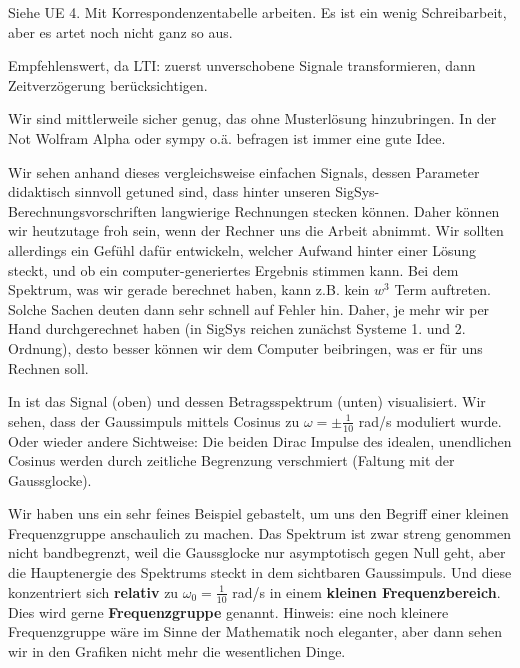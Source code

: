 \begin{Werkzeug}
Siehe UE 4. Mit Korrespondenzentabelle arbeiten. Es ist ein wenig Schreibarbeit,
aber es artet noch nicht ganz so aus.
\end{Werkzeug}
\begin{Ansatz}
Empfehlenswert, da LTI: zuerst unverschobene Signale transformieren,
dann Zeitverzögerung berücksichtigen.
\end{Ansatz}
\begin{ExCalc}
Wir sind mittlerweile sicher genug, das ohne Musterlösung hinzubringen.
In der Not Wolfram Alpha oder sympy o.ä. befragen ist immer eine gute Idee.
\end{ExCalc}
\begin{Loesung}
Wir sehen anhand dieses vergleichsweise einfachen Signals, dessen Parameter
didaktisch sinnvoll getuned sind, dass hinter unseren SigSys-Berechnungsvorschriften
langwierige Rechnungen stecken können. Daher können wir heutzutage froh sein,
wenn der Rechner uns die Arbeit abnimmt.
Wir sollten allerdings ein Gefühl dafür entwickeln, welcher Aufwand hinter
einer Lösung steckt, und ob ein computer-generiertes Ergebnis stimmen
kann. Bei dem Spektrum, was wir gerade berechnet haben, kann z.B.
kein $w^3$ Term auftreten. Solche Sachen deuten dann sehr schnell auf Fehler hin.
Daher, je mehr wir per Hand durchgerechnet haben (in SigSys reichen zunächst
Systeme 1. und 2. Ordnung), desto besser können wir dem Computer beibringen, was er
für uns Rechnen soll.

In  ist das Signal (oben) und dessen
Betragsspektrum (unten) visualisiert.
%
Wir sehen, dass der Gaussimpuls mittels Cosinus zu $\omega=\pm \frac{1}{10}$ rad/s
moduliert wurde.
Oder wieder andere Sichtweise: Die beiden Dirac Impulse des idealen, unendlichen
Cosinus werden durch zeitliche Begrenzung verschmiert (Faltung mit der Gaussglocke).
%

Wir haben uns ein sehr feines Beispiel gebastelt, um uns den
Begriff einer kleinen Frequenzgruppe anschaulich zu machen.
Das Spektrum ist zwar streng genommen nicht bandbegrenzt, weil die Gaussglocke
nur asymptotisch gegen Null geht, aber die Hauptenergie des Spektrums
steckt in dem sichtbaren Gaussimpuls.
Und diese konzentriert sich \textbf{relativ} zu $\omega_0=\frac{1}{10}$ rad/s in einem
\textbf{kleinen Frequenzbereich}. Dies wird gerne \textbf{Frequenzgruppe} genannt.
Hinweis: eine noch kleinere Frequenzgruppe wäre im Sinne der Mathematik noch
eleganter, aber dann sehen wir in den Grafiken nicht mehr die wesentlichen Dinge.
\end{Loesung}

